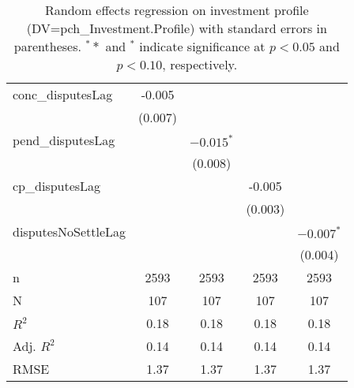 \begin{table}[ht]
\begin{tabular}{lcccc}
  conc\_disputesLag & -0.005 &  &  &  \\ 
   & (0.007) &  &  &  \\ 
  pend\_disputesLag &  & $-0.015^{\ast}$ &  &  \\ 
   &  & (0.008) &  &  \\ 
  cp\_disputesLag &  &  & -0.005 &  \\ 
   &  &  & (0.003) &  \\ 
  disputesNoSettleLag &  &  &  & $-0.007^{\ast}$ \\ 
   &  &  &  & (0.004) \\ 
   \hline
n & 2593 & 2593 & 2593 & 2593 \\ 
  N & 107 & 107 & 107 & 107 \\ 
  $R^{2}$ & 0.18 & 0.18 & 0.18 & 0.18 \\ 
  Adj. $R^{2}$ & 0.14 & 0.14 & 0.14 & 0.14 \\ 
  RMSE & 1.37 & 1.37 & 1.37 & 1.37 \\ 
   \hline
\hline
\end{tabular}
\caption{Random effects regression on investment profile (DV=pch\_Investment.Profile) with standard errors in parentheses. $^**$ and $^*$ indicate significance at $p< 0.05 $ and $p< 0.10 $, respectively.} 
\end{table}
